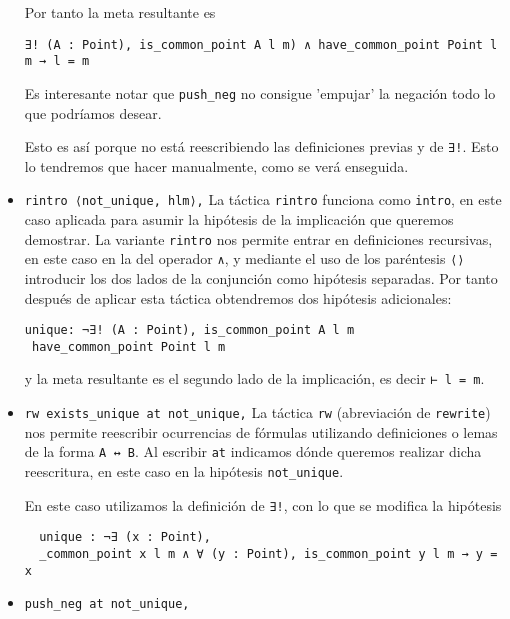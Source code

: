 \begin{itemize}
	      Por tanto la meta resultante es
	      \begin{lstlisting}
∃! (A : Point), is_common_point A l m) ∧ have_common_point Point l m → l = m
   \end{lstlisting}
	      Es interesante notar que \lstinline{push_neg} no consigue 'empujar' la negación todo lo que podríamos desear.

	      Esto es así porque no está reescribiendo las definiciones previas y de
	      \lstinline{∃!}. Esto lo tendremos que hacer manualmente, como se verá enseguida.

	\item \lstinline{rintro ⟨not_unique, hlm⟩,} La táctica \lstinline{rintro} funciona como
	      \lstinline{intro}, en este caso aplicada para asumir la hipótesis de la implicación
	      que queremos demostrar. La variante \lstinline{rintro} nos permite entrar en
	      definiciones recursivas, en este caso en la del operador \lstinline{∧}, y mediante
	      el uso de los paréntesis \lstinline{⟨⟩} introducir los dos lados de la conjunción
	      como hipótesis separadas. Por tanto después de aplicar esta táctica
	      obtendremos dos hipótesis adicionales:
	      \begin{lstlisting}
unique: ¬∃! (A : Point), is_common_point A l m
 have_common_point Point l m
      \end{lstlisting}
	      y la meta resultante es el segundo lado de la implicación, es decir \lstinline{⊢ l = m}.

	\item \lstinline{rw exists_unique at not_unique,}  La táctica \lstinline{rw}
	      (abreviación de \lstinline{rewrite}) nos permite reescribir ocurrencias
	      de fórmulas utilizando definiciones o lemas de la forma
	      \lstinline{A ↔ B}. Al escribir \lstinline{at} indicamos dónde queremos realizar dicha
	      reescritura, en este caso en la hipótesis \lstinline{not_unique}.

	      En este caso utilizamos la definición de \lstinline{∃!}, con lo que se
	      modifica la hipótesis
	      \begin{lstlisting}
  unique : ¬∃ (x : Point), 
  _common_point x l m ∧ ∀ (y : Point), is_common_point y l m → y = x
      \end{lstlisting}

	\item \lstinline{push_neg at not_unique,}


\end{itemize}
